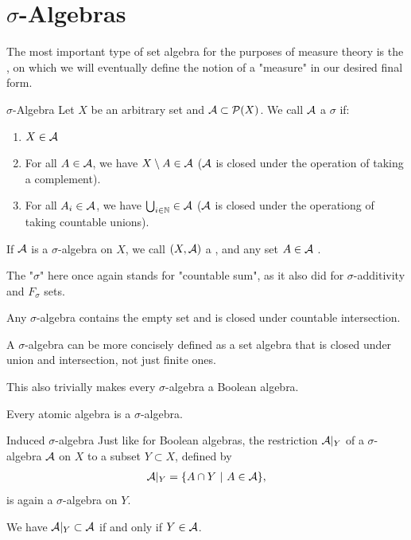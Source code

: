 \section{$\sigma$-Algebras}
The most important type of set algebra for the purposes of measure theory is the , on which we will eventually define the notion of a "measure" in our desired final form.
\begin{importantdefinition}{$\sigma$-Algebra}{}
	Let $X$ be an arbitrary set and $\mathcal{A} \subset \mathcal{P}(X)$. We call $\mathcal{A}$ a $\sigma$ if:
	\begin{enumerate}
		\item $X \in \mathcal{A}$
		\item For all $A \in \mathcal{A}$, we have $X \setminus A \in \mathcal{A}$ ($\mathcal{A}$ is closed under the operation of taking a complement).
		\item For all $A_i \in \mathcal{A}$, we have $\bigcup_{i \in \mathbb{N}} \in \mathcal{A}$ ($\mathcal{A}$ is closed under the operationg of taking countable unions).
	\end{enumerate}
	If $\mathcal{A}$ is a $\sigma$-algebra on $X$, we call $(X,\mathcal{A})$ a , and any set $A \in \mathcal{A}$ .
\end{importantdefinition}
The "$\sigma$" here once again stands for "countable sum", as it also did for $\sigma$-additivity and $F_\sigma$ sets.
\begin{corollary}
	Any $\sigma$-algebra contains the empty set and is closed under countable intersection.
\end{corollary}
\begin{corollary}
	A $\sigma$-algebra can be more concisely defined as a set algebra that is closed under  union and intersection, not just finite ones.
\end{corollary}
This also trivially makes every $\sigma$-algebra a Boolean algebra.
\begin{theorem}
	Every atomic algebra is a $\sigma$-algebra.
\end{theorem}
\begin{importanttheorem}{Induced $\sigma$-algebra}{}
	Just like for Boolean algebras, the restriction $\mathcal{A}|_Y$ of a $\sigma$-algebra $\mathcal{A}$ on $X$ to a subset $Y \subset X$, defined by
	\begin{align*}
		\mathcal{A}|_Y = \qty{A \cap Y ~\middle|~A \in \mathcal{A}},
	\end{align*}
	is again a $\sigma$-algebra on $Y$.
\end{importanttheorem}
\begin{theorem}
	We have $\mathcal{A}|_Y \subset \mathcal{A}$ if and only if $Y \in \mathcal{A}$.
\end{theorem}
